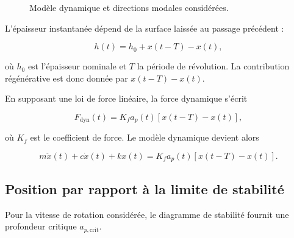 \documentclass[
    11pt,
    a4paper
]{article}
\begin{document}

\begin{figure}[H]
    \centering
    \caption{Modèle dynamique et directions modales considérées.}
    \label{fig:modele_2ddl}
\end{figure}



L'épaisseur instantanée dépend de la surface laissée au passage précédent :

\begin{equation}
    h(t)=h_0+x(t-T)-x(t),
    \label{eq:epaisseur-regenerative}
\end{equation}

où \(h_0\) est l'épaisseur nominale et \(T\) la période de révolution. La
contribution régénérative est donc donnée par \(x(t-T)-x(t)\).

En supposant une loi de force linéaire, la force dynamique s'écrit

\begin{equation}
    F_{\mathrm{dyn}}(t)
    =
    K_f a_p(t)\left[x(t-T)-x(t)\right],
    \label{eq:force-regenerative}
\end{equation}

où \(K_f\) est le coefficient de force. Le modèle dynamique devient alors

\begin{equation}
    m\ddot{x}(t)+c\dot{x}(t)+kx(t)
    =
    K_f a_p(t)\left[x(t-T)-x(t)\right].
    \label{eq:equation-regenerative}
\end{equation}


\subsection{Position par rapport à la limite de stabilité}
\label{subsec:stabilite}

Pour la vitesse de rotation considérée, le diagramme de stabilité fournit une
profondeur critique \(a_{p,\mathrm{crit}}\).
\end{document}
